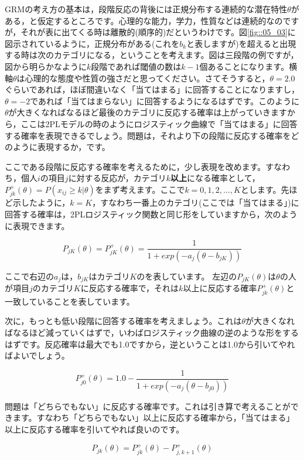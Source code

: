 \documentclass{ltjsbook}
\begin{document}
GRMの考え方の基本は，段階反応の背後には正規分布する連続的な潜在特性$\theta$がある，と仮定するところです。心理的な能力，学力，性質などは連続的なのですが，それが表に出てくる時は離散的(順序的)だというわけです。図\ref{fig::05_03}に図示されているように，正規分布がある(これを$b_k$と表しますが)を超えると出現する時は次のカテゴリになる，ということを考えます。図は三段階の例ですが，図から明らかなように$k$段階であれば閾値の数は$k-1$個あることになります。横軸$\theta$は心理的な態度や性質の強さだと思ってください。さてそうすると，$\theta=2.0$ぐらいであれば，ほぼ間違いなく「当てはまる」に回答することになりますし，$\theta=-2$であれば「当てはまらない」に回答するようになるはずです。このように$\theta$が大きくなればなるほど最後のカテゴリに反応する確率は上がっていきますから，ここは2PLモデルの時のようにロジスティック曲線で「当てはまる」に回答する確率を表現できるでしょう。問題は，それより下の段階に反応する確率をどのように表現するか，です。

ここである段階に反応する確率を考えるために，少し表現を改めます。すなわち，個人$i$の項目$j$に対する反応が，カテゴリ$k$\textbf{以上}になる確率として，$P^{+}_{jk}(\theta) = P(x_{ij} \ge k|\theta)$をまず考えます。ここで$k=0,1,2,...,K$とします。先ほど示したように，$k=K$，すなわち一番上のカテゴリ(ここでは「当てはまる」)に回答する確率は，2PLロジスティック関数と同じ形をしていますから，次のように表現できます。

\[ P_{jK}(\theta) = P^{+}_{jK}(\theta) = \frac{1}{1+exp(-a_j(\theta-b_{jK}))} \]

ここで右辺の$a_j$は，$b_{jK}$はカテゴリ$K$のを表しています。
左辺の$P_{jK}(\theta)$は$\theta$の人が項目$j$のカテゴリ$K$に反応する確率で，それは$k$以上に反応する確率$P^{+}_{jk}(\theta)$と一致していることを表しています。

次に，もっとも低い段階に回答する確率を考えましょう。これは$\theta$が大きくなればなるほど減っていくはずで，いわばロジスティック曲線の逆のような形をするはずです。反応確率は最大でも1.0ですから，逆ということは1.0から引いてやればよいでしょう。

\[ P^{+}_{j0}(\theta) = 1.0 -   \frac{1}{1+exp(-a_j(\theta-b_{j0}))} \]

問題は「どちらでもない」に反応する確率です。これは引き算で考えることができます。すなわち「どちらでもない」以上に反応する確率から，「当てはまる」以上に反応する確率を引いてやれば良いのです。

\[P_{jk}(\theta) = P^{+}_{jk}(\theta)-P^{+}_{j,k+1}(\theta) \]
\end{document}
